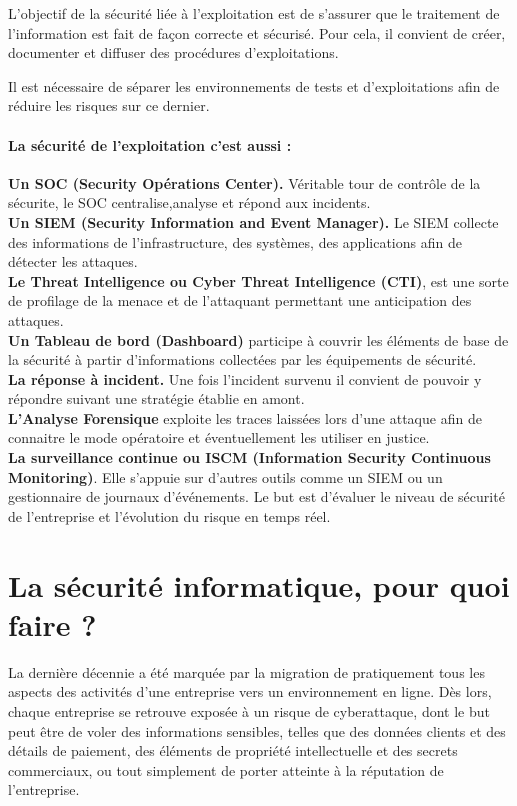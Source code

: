  L’objectif de la sécurité liée à l’exploitation est de s’assurer que le traitement de l’information est fait de façon correcte et sécurisé. Pour cela, il convient de créer, documenter et diffuser des procédures d’exploitations.
 
 Il est nécessaire de séparer les environnements de tests et d’exploitations afin de réduire les risques sur ce dernier.
 
 \paragraph{La sécurité de l’exploitation c’est aussi :\\}
 \textbf{Un SOC (Security Opérations Center).} Véritable tour de contrôle de la sécurite, le SOC centralise,analyse et répond aux incidents.\\
 
 \textbf{Un SIEM (Security Information and Event Manager).} Le SIEM collecte des informations de l’infrastructure, des systèmes, des applications afin de détecter les attaques.\\
 
\textbf{Le Threat Intelligence ou Cyber Threat Intelligence (CTI)}, est une sorte de profilage de la menace et de l’attaquant permettant une anticipation des attaques.\\
 
 \textbf{Un Tableau de bord (Dashboard)} participe à couvrir les éléments de base de la sécurité à partir d’informations collectées par les équipements de sécurité.\\
 
\textbf{La réponse à incident.} Une fois l’incident survenu il convient de pouvoir y répondre suivant une stratégie établie en amont.\\
 
 \textbf{L’Analyse Forensique} exploite les traces laissées lors d’une attaque afin de connaitre le mode opératoire et éventuellement les utiliser en justice.\\
 
\textbf{La surveillance continue ou ISCM (Information Security Continuous Monitoring)}.
 Elle s’appuie sur d’autres outils comme un SIEM ou un gestionnaire de journaux d’événements. Le but est d’évaluer le niveau de sécurité de l’entreprise et l’évolution du risque en temps réel.\\
 
 \section{La sécurité informatique, pour quoi faire ?}
 La dernière décennie a été marquée par la migration de pratiquement tous les aspects des activités d’une entreprise vers un environnement en ligne. Dès lors, chaque entreprise se retrouve exposée à un risque de cyberattaque, dont le but peut être de voler des informations sensibles, telles que des données clients et des détails de paiement, des éléments de propriété intellectuelle et des secrets commerciaux, ou tout simplement de porter atteinte à la réputation de l’entreprise.\pagebreak

